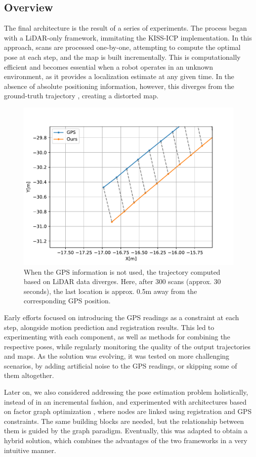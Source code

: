 \subsection{Overview}

The final architecture is the result of a series of experiments. The process began with a LiDAR-only framework, immitating the KISS-ICP \cite{vizzo2023ral} implementation.  In this approach, scans are processed one-by-one, attempting to compute the optimal pose at each step, and the map is built incrementally. This is computationally efficient and becomes essential when a robot operates in an unknown environment, as it provides a localization estimate at any given time. In the absence of absolute positioning information, however, this diverges from the ground-truth trajectory , creating a distorted map.

\begin{figure}[h]
	\centering
	\includegraphics[width=0.45\linewidth]{images/deviation_30s.pdf}
	\caption[Trajectory deviation from GPS]{When the GPS information is not used, the trajectory computed based on LiDAR data diverges. Here, after 300 scans (approx. 30 seconds), the last location is approx. 0.5m away from the corresponding GPS position.}
	\label{fig:deviation-no-gps}
\end{figure}

Early efforts focused on introducing the GPS readings as a constraint at each step, alongside motion prediction and registration results. This led to experimenting with each component, as well as methods for combining the respective poses, while regularly monitoring the quality of the output trajectories and maps. As the solution was evolving, it was tested on more challenging scenarios, by adding artificial noise to the GPS readings, or skipping some of them altogether.

Later on, we also considered addressing the pose estimation problem holistically, instead of in an incremental fashion, and experimented with architectures based on factor graph optimization \cite{dellaert2017factor}, where nodes are linked using registration and GPS constraints. The same building blocks are needed, but the relationship between them is guided by the graph paradigm. Eventually, this was adapted to obtain a hybrid solution, which combines the advantages of the two frameworks in a very intuitive manner.


